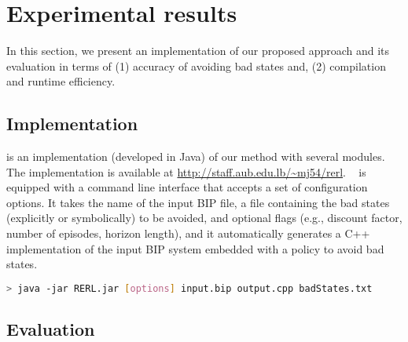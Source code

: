 \section{Experimental results}
\label{sec:bench}
In this section, we present \rerl an implementation of our proposed approach and its evaluation in terms of (1) accuracy of avoiding bad states and, (2) compilation and runtime efficiency. 
\subsection{Implementation}
\rerl is an implementation (developed in Java) of our method with several modules. The implementation is available at \href{http://staff.aub.edu.lb/~mj54/rerl}{http://staff.aub.edu.lb/\~{}mj54/rerl}. 
\rerl~ is equipped with a command line interface that accepts a set of configuration options. 
It takes the name of the input BIP file, a file containing the bad states (explicitly or symbolically) to be avoided,  and optional flags (e.g., discount factor, number of episodes, horizon length), and it automatically generates a C++ implementation of the input BIP system embedded with a policy to avoid bad states. 
\begin{lstlisting}[language=Bash]
> java -jar RERL.jar [options] input.bip output.cpp badStates.txt
\end{lstlisting}

\subsection{Evaluation}
